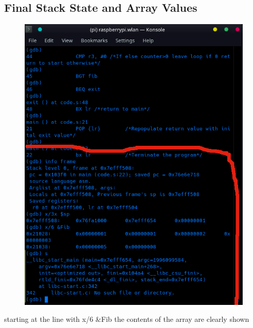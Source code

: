 \documentclass{article}
\begin{document}
	\subsection{Final Stack State and Array Values}
	\begin{figure}[h!]
		\centering
		\includegraphics[width=\textwidth]{stack_final_fib_values.png}
	\end{figure}
	starting at the line with x/6 \&Fib the contents of the array are clearly shown 
	\newpage
\end{document}
